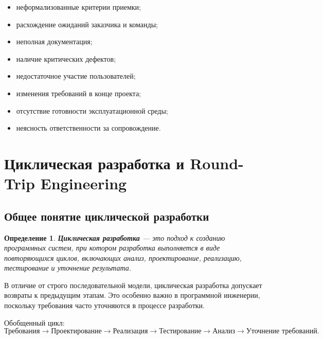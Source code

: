 \documentclass[12pt,a4paper]{article}
\newtheorem{definition}{Определение}
\begin{document}
\begin{itemize}
    \item неформализованные критерии приемки;
    \item расхождение ожиданий заказчика и команды;
    \item неполная документация;
    \item наличие критических дефектов;
    \item недостаточное участие пользователей;
    \item изменения требований в конце проекта;
    \item отсутствие готовности эксплуатационной среды;
    \item неясность ответственности за сопровождение.
\end{itemize}

\section{Циклическая разработка и Round-Trip Engineering}

\subsection{Общее понятие циклической разработки}

\begin{definition}
\textbf{Циклическая разработка} --- это подход к созданию программных систем, при котором разработка выполняется в виде повторяющихся циклов, включающих анализ, проектирование, реализацию, тестирование и уточнение результата.
\end{definition}

В отличие от строго последовательной модели, циклическая разработка допускает возвраты к предыдущим этапам. Это особенно важно в программной инженерии, поскольку требования часто уточняются в процессе разработки.

Обобщенный цикл:
\[
\text{Требования}
\rightarrow
\text{Проектирование}
\rightarrow
\text{Реализация}
\rightarrow
\text{Тестирование}
\rightarrow
\text{Анализ}
\rightarrow
\text{Уточнение требований}.
\]

\begin{center}
\end{center}
\end{document}
